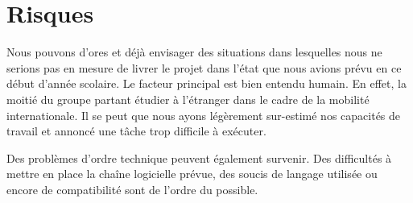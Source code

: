 \chapter{Risques}
	Nous pouvons d'ores et déjà envisager des situations dans lesquelles nous ne serions pas en mesure de livrer le projet dans l'état que nous avions prévu en ce début d'année scolaire.
	Le facteur principal est bien entendu humain. En effet, la moitié du groupe partant étudier à l'étranger dans le cadre de la mobilité internationale. Il se peut que nous ayons légèrement sur-estimé nos capacités de travail et annoncé une tâche trop difficile à exécuter.

	Des problèmes d'ordre technique peuvent également survenir. Des difficultés à mettre en place la chaîne logicielle prévue, des soucis de langage utilisée ou encore de compatibilité sont de l'ordre du possible.